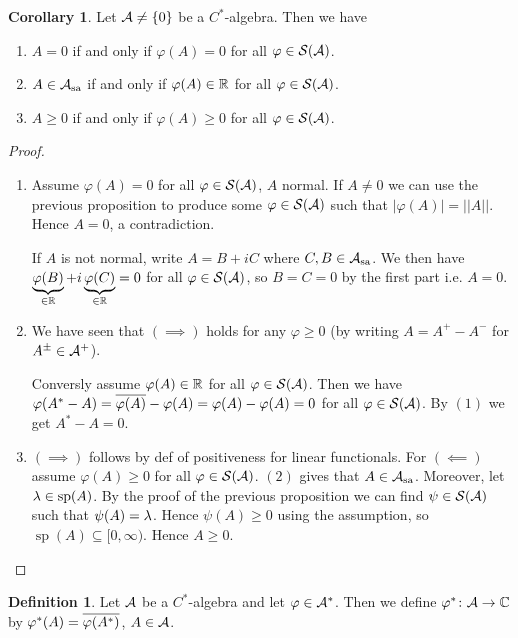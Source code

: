 \documentclass[10pt,english,a4paper]{article}
\theoremstyle{definition}
\newtheorem*{definition}{Definition}
\newtheorem*{corollary}{Corollary}
\def\Assa{\As_{\text{sa}}}
\DeclareMathOperator{\Sp}{sp}
\def\vphi{\varphi}
\begin{document}
\begin{corollary}
    Let $\mathcal{A} \neq \{0\}$ be a $C^*$-algebra. Then we have 
\begin{enumerate}[(1)]
    \item $A =0$ if and only if $\vphi(A)=0$ for all $\vphi \in \Ss(\As)$.
    \item $A \in\Assa$ if and only if $\vphi(A)\in \R$ for all $\vphi \in \Ss(\As)$.
    \item $A \geq 0$ if and only if $\vphi(A)\geq 0$ for all $\vphi \in \Ss(\As)$.
\end{enumerate}
\end{corollary}
\begin{proof}

\begin{enumerate}[(1)]
    \item Assume $\vphi(A) =0$ for all $\vphi \in \Ss(\As)$, $A$ normal.
If $A\neq 0$ we can use the previous proposition to produce some $\vphi \in \Ss(\As)$
such that $|\vphi(A)| = ||A||$. Hence $A = 0$, a contradiction. 

If $A$ is not normal, write $A = B + iC$ where $C,B\in \Assa$. We then have 
$\ub{\vphi(B)}_{\in \R} + i\ub{\vphi(C)}_{\in \R} = 0$ for all $\vphi\in \Ss(\As)$,
so $B = C = 0$ by the first part i.e. $A = 0$.

\item We have seen that $(\implies)$ holds for any $\vphi\geq 0$ 
(by writing $A = A^+-A^-$ for $A^{\pm} \in \mathcal{A}^+$).

Conversly assume $\vphi(A) \in \R$ for all $\vphi \in \Ss(\As)$. 
Then we have $\vphi(A^*-A) = \ol{\vphi(A)}-\vphi(A) = \vphi(A)-\vphi(A) = 0$
for all $\vphi\in \Ss(\As)$. By $(1)$ we get $A^*-A=0$.

\item $(\implies)$ follows by def of positiveness for linear functionals.
For $(\impliedby)$  assume $\vphi(A)\geq 0$ for all $\vphi\in \Ss(\As)$. 
$(2)$ gives that $A \in \Assa$. Moreover, let $\la \in \Sp(A)$. By the proof of the previous
proposition we can find $\psi \in \mathcal{S}(\mathcal{A})$ such that $\psi(A)= \lambda$.
Hence $\psi(A)\geq 0$ using the assumption, so $\Sp(A)\subseteq [0,\infty)$.
Hence $A\geq 0$.
\end{enumerate}

\end{proof}
\begin{definition}
    Let $\mathcal{A}$ be a $C^*$-algebra and let 
     $\vphi \in \As^*$. Then we define 
$\vphi^*\colon \As\to \C$ by $\vphi^*(A) = \ol{\vphi(A^*)}$, $A\in \mathcal{A}$.
\end{definition}
\end{document}
